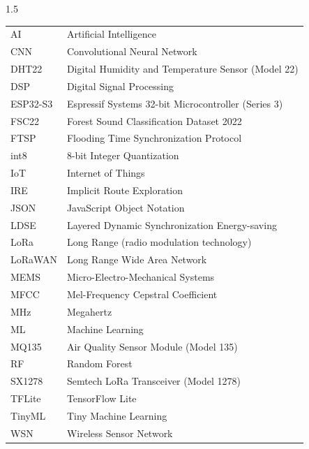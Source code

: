 \begin{spacing}{1.5}
\begin{longtable}{@{}p{3.5cm}p{10.5cm}@{}}
AI        & Artificial Intelligence \\
CNN       & Convolutional Neural Network \\
DHT22     & Digital Humidity and Temperature Sensor (Model 22) \\
DSP       & Digital Signal Processing \\
ESP32-S3  & Espressif Systems 32-bit Microcontroller (Series 3) \\
FSC22     & Forest Sound Classification Dataset 2022 \\
FTSP      & Flooding Time Synchronization Protocol \\
int8      & 8-bit Integer Quantization \\
IoT       & Internet of Things \\
IRE       & Implicit Route Exploration \\
JSON      & JavaScript Object Notation \\
LDSE      & Layered Dynamic Synchronization Energy-saving \\
LoRa      & Long Range (radio modulation technology) \\
LoRaWAN   & Long Range Wide Area Network \\
MEMS      & Micro-Electro-Mechanical Systems \\
MFCC      & Mel-Frequency Cepstral Coefficient \\
MHz       & Megahertz \\
ML        & Machine Learning \\
MQ135     & Air Quality Sensor Module (Model 135) \\
RF        & Random Forest \\
SX1278    & Semtech LoRa Transceiver (Model 1278) \\
TFLite    & TensorFlow Lite \\
TinyML    & Tiny Machine Learning \\
WSN       & Wireless Sensor Network \\
\end{longtable}
\end{spacing}

\clearpage
